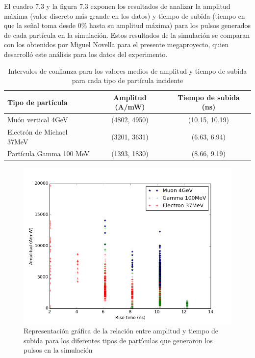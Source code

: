 \documentclass{book}
\begin{document}
El cuadro 7.3 y la figura 7.3 exponen los resultados de analizar la amplitud m\'axima (valor discreto m\'as grande en los datos) y tiempo de subida (tiempo en que la se\~nal toma desde 0\% hasta su amplitud m\'axima) para los pulsos generados de cada part\'icula en la simulaci\'on. Estos resultados de la simulaci\'on se comparan con los obtenidos por Miguel Novella para el presente megaproyecto, quien desarroll\'o este an\'alisis para los datos del experimento.

\begin{table}[h]
\caption{ Intervalos de confianza para los valores medios de amplitud y tiempo de subida para cada tipo de part\'icula incidente}
\centering
\begin{tabular}{l | c c}
\hline
Tipo de part\'icula & Amplitud (A/mW) & Tiempo de subida (ns) \\ \hline
Mu\'on vertical 4GeV & (4802, 4950) & (10.15, 10.19) \\
Electr\'on de Michael 37MeV & (3201, 3631) & (6.63, 6.94) \\
Part\'icula Gamma 100 MeV & (1393, 1830) & (8.66, 9.19)\\

\hline
\end{tabular}
\end{table}

\begin{figure}[h] %
\begin{center}
 \includegraphics[width=\linewidth]{RiseTimeAmp.png}
\caption{Representaci\'on gr\'afica de la relaci\'on entre amplitud y tiempo de subida para los diferentes tipos de part\'iculas que generaron los pulsos en la simulaci\'on}
\end{center}
\end{figure}
\end{document}
